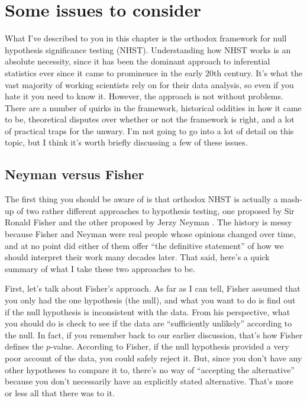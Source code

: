 \documentclass[
]{book}
\begin{document}
\hypertarget{nhstmess}{%
\section{Some issues to consider}\label{nhstmess}}

What I've described to you in this chapter is the orthodox framework for null hypothesis significance testing (NHST). Understanding how NHST works is an absolute necessity, since it has been the dominant approach to inferential statistics ever since it came to prominence in the early 20th century. It's what the vast majority of working scientists rely on for their data analysis, so even if you hate it you need to know it. However, the approach is not without problems. There are a number of quirks in the framework, historical oddities in how it came to be, theoretical disputes over whether or not the framework is right, and a lot of practical traps for the unwary. I'm not going to go into a lot of detail on this topic, but I think it's worth briefly discussing a few of these issues.

\hypertarget{neyman-versus-fisher}{%
\subsection{Neyman versus Fisher}\label{neyman-versus-fisher}}

The first thing you should be aware of is that orthodox NHST is actually a mash-up of two rather different approaches to hypothesis testing, one proposed by Sir Ronald Fisher and the other proposed by Jerzy Neyman \citep[for a historical summary see][]{Lehmann2011}. The history is messy because Fisher and Neyman were real people whose opinions changed over time, and at no point did either of them offer ``the definitive statement'' of how we should interpret their work many decades later. That said, here's a quick summary of what I take these two approaches to be.

First, let's talk about Fisher's approach. As far as I can tell, Fisher assumed that you only had the one hypothesis (the null), and what you want to do is find out if the null hypothesis is inconsistent with the data. From his perspective, what you should do is check to see if the data are ``sufficiently unlikely'' according to the null. In fact, if you remember back to our earlier discussion, that's how Fisher defines the \(p\)-value. According to Fisher, if the null hypothesis provided a very poor account of the data, you could safely reject it. But, since you don't have any other hypotheses to compare it to, there's no way of ``accepting the alternative'' because you don't necessarily have an explicitly stated alternative. That's more or less all that there was to it.
\end{document}
